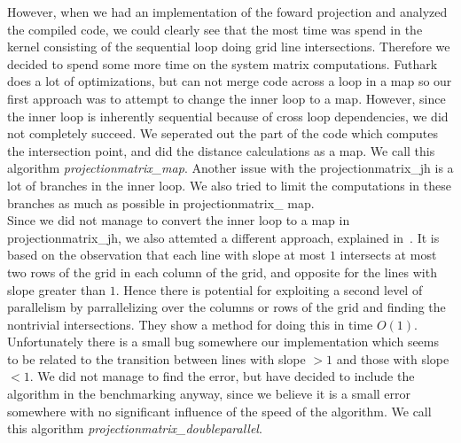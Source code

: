 However, when we had an implementation of the foward projection and analyzed the compiled code, we could clearly see that the most time was spend in the kernel consisting of the sequential loop doing grid line intersections. Therefore we decided to spend some more time on the system matrix computations. Futhark does a lot of optimizations, but can not merge code across a loop in a map so our first approach was to attempt to change the inner loop to a map. However, since the inner loop is inherently sequential because of cross loop dependencies, we did not completely succeed. We seperated out the part of the code which computes the intersection point, and did the distance calculations as a map. We call this algorithm \emph{projectionmatrix\_map}.
Another issue with the projectionmatrix\_jh is a lot of branches in the inner loop. We also tried to limit the computations in these branches as much as possible in projectionmatrix\_ map.\\
Since we did not manage to convert the inner loop to a map in projectionmatrix_jh, we also attemted a different approach, explained in~\cite{Gao2012}. It is based on the observation that each line with slope at most $1$ intersects at most two rows of the grid in each column of the grid, and opposite for the lines with slope greater than $1$. Hence there is potential for exploiting a second level of parallelism by parrallelizing over the columns or rows of the grid and finding the nontrivial intersections. They show a method for doing this in time $O(1)$. Unfortunately there is a small bug somewhere our implementation which seems to be related to the transition between lines with slope $>1$ and those with slope $<1$. We did not manage to find the error, but have decided to include the algorithm in the benchmarking anyway, since we believe it is a small error somewhere with no significant influence of the speed of the algorithm. We call this algorithm \emph{projectionmatrix\_doubleparallel}.
